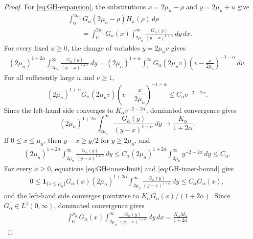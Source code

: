 \documentclass[10pt,a4paper]{amsart}
\newcommand{\one}{\mathbf 1}
\begin{document}
\begin{proof}
For \eqref{eq:GH-expansion}, the substitutions
$x=2\mu_n-\rho$ and $y=2\mu_n+u$ give
\begin{equation}\label{eq:GH-double-integral}
 \begin{aligned}
 &\int_0^{2\mu_n}G_\alpha(2\mu_n-\rho)H_n(\rho)\,d\rho\\
 &\qquad=\int_0^{2\mu_n}G_\alpha(x)
 \int_{2\mu_n}^\infty
 \frac{G_\alpha(y)}{(y-x)^{1+\alpha}}\,dy\,dx.
 \end{aligned}
\end{equation}
For every fixed $x\ge0$, the change of variables $y=2\mu_nv$ gives
\[
 \begin{aligned}
 (2\mu_n)^{1+2\alpha}\int_{2\mu_n}^\infty
 \frac{G_\alpha(y)}{(y-x)^{1+\alpha}}\,dy=(2\mu_n)^{1+\alpha}\int_1^\infty
 G_\alpha(2\mu_nv)
 \left(v-\frac{x}{2\mu_n}\right)^{-1-\alpha}\,dv.
 \end{aligned}
\]
For all sufficiently large $n$ and $v\ge1$,
\[
 (2\mu_n)^{1+\alpha}G_\alpha(2\mu_nv)
 \left(v-\frac{x}{2\mu_n}\right)^{-1-\alpha}
 \le C_\alpha v^{-2-2\alpha}.
\]
Since the left-hand side converges to
$K_\alpha v^{-2-2\alpha}$, dominated convergence gives
\begin{equation}\label{eq:GH-inner-limit}
 (2\mu_n)^{1+2\alpha}\int_{2\mu_n}^\infty
 \frac{G_\alpha(y)}{(y-x)^{1+\alpha}}\,dy
 \longrightarrow\frac{K_\alpha}{1+2\alpha}.
\end{equation}
If $0\le x\le\mu_n$, then $y-x\ge y/2$ for $y\ge2\mu_n$, and
\begin{equation}\label{eq:GH-inner-bound}
 \begin{aligned}
 (2\mu_n)^{1+2\alpha}\int_{2\mu_n}^\infty
 \frac{G_\alpha(y)}{(y-x)^{1+\alpha}}\,dy\le C_\alpha(2\mu_n)^{1+2\alpha}
 \int_{2\mu_n}^\infty y^{-2-2\alpha}\,dy
 \le C_\alpha.
 \end{aligned}
\end{equation}
For every $x\ge0$, equations \eqref{eq:GH-inner-limit} and
\eqref{eq:GH-inner-bound} give
\[
 \begin{aligned}
 0\le\one_{\{x\le\mu_n\}}G_\alpha(x)(2\mu_n)^{1+2\alpha}
 \int_{2\mu_n}^\infty
 \frac{G_\alpha(y)}{(y-x)^{1+\alpha}}\,dy\le C_\alpha G_\alpha(x),
 \end{aligned}
\]
and the left-hand side converges pointwise to
$K_\alpha G_\alpha(x)/(1+2\alpha)$.  Since
$G_\alpha\in L^1(0,\infty)$, dominated convergence gives
\begin{equation}\label{eq:GH-main-range}
 \begin{aligned}
 \int_0^{\mu_n}G_\alpha(x)\int_{2\mu_n}^\infty
 \frac{G_\alpha(y)}{(y-x)^{1+\alpha}}\,dy\,dx=\frac{K_\alpha M_\alpha}{1+2\alpha}

\end{aligned}
\end{equation}
\end{proof}
\end{document}
